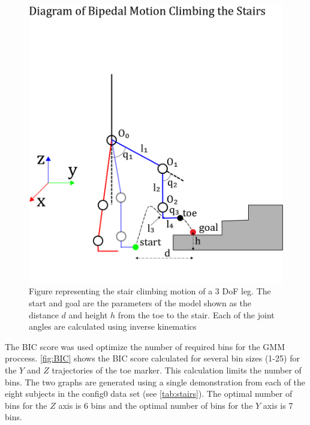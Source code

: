  
\begin{figure} 
    \centering 
    \includegraphics[scale=0.9]{images/stairs/stick.png}
    \caption[Stair Climbing Motion]{Figure representing the stair climbing motion of a 3 DoF leg. The start and goal are the parameters of the model shown as the distance $d$ and height $h$ from the toe to the stair. Each of the joint angles are calculated using inverse kinematics} 
    \label{fig:stick}
\end{figure} 



The BIC score was used optimize the number of required bins for the GMM proccess. \autoref{fig:BIC} shows the BIC score calculated for several bin sizes (1-25) for the $ Y $ and $ Z $ trajectories of the toe marker. This calculation limits the number of bins. The two graphs are generated using a single demonstration from each of the eight subjects in the config0 data set (see \autoref{tab:stairs}). The optimal number of bins for the $Z$ axis is 6 bins and the optimal number of bins for the $Y$ axis is 7 bins. 


